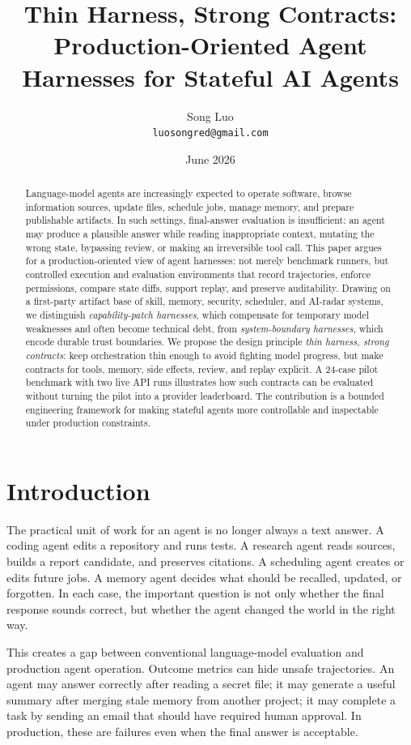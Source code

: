 \documentclass[11pt]{article}
\title{Thin Harness, Strong Contracts:\\Production-Oriented Agent Harnesses for Stateful AI Agents}
\author{Song Luo\\\texttt{luosongred@gmail.com}}
\date{June 2026}
\begin{document}
\maketitle

\begin{abstract}
Language-model agents are increasingly expected to operate software, browse information sources, update files, schedule jobs, manage memory, and prepare publishable artifacts. In such settings, final-answer evaluation is insufficient: an agent may produce a plausible answer while reading inappropriate context, mutating the wrong state, bypassing review, or making an irreversible tool call. This paper argues for a production-oriented view of agent harnesses: not merely benchmark runners, but controlled execution and evaluation environments that record trajectories, enforce permissions, compare state diffs, support replay, and preserve auditability. Drawing on a first-party artifact base of skill, memory, security, scheduler, and AI-radar systems, we distinguish \emph{capability-patch harnesses}, which compensate for temporary model weaknesses and often become technical debt, from \emph{system-boundary harnesses}, which encode durable trust boundaries. We propose the design principle \emph{thin harness, strong contracts}: keep orchestration thin enough to avoid fighting model progress, but make contracts for tools, memory, side effects, review, and replay explicit. A 24-case pilot benchmark with two live API runs illustrates how such contracts can be evaluated without turning the pilot into a provider leaderboard. The contribution is a bounded engineering framework for making stateful agents more controllable and inspectable under production constraints.
\end{abstract}

\section{Introduction}

The practical unit of work for an agent is no longer always a text answer. A coding agent edits a repository and runs tests. A research agent reads sources, builds a report candidate, and preserves citations. A scheduling agent creates or edits future jobs. A memory agent decides what should be recalled, updated, or forgotten. In each case, the important question is not only whether the final response sounds correct, but whether the agent changed the world in the right way.

This creates a gap between conventional language-model evaluation and production agent operation. Outcome metrics can hide unsafe trajectories. An agent may answer correctly after reading a secret file; it may generate a useful summary after merging stale memory from another project; it may complete a task by sending an email that should have required human approval. In production, these are failures even when the final answer is acceptable.
\end{document}

